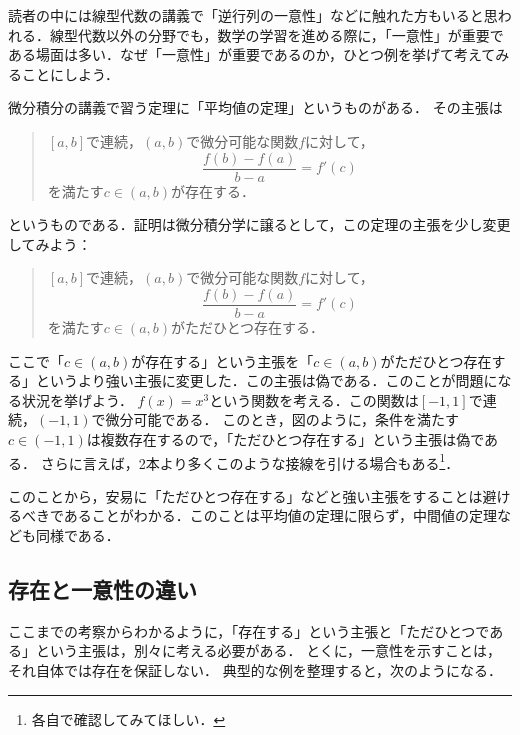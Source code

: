 読者の中には線型代数の講義で「逆行列の一意性」などに触れた方もいると思われる．線型代数以外の分野でも，数学の学習を進める際に，「一意性」が重要である場面は多い．なぜ「一意性」が重要であるのか，ひとつ例を挙げて考えてみることにしよう．

微分積分の講義で習う定理に「平均値の定理」というものがある．
その主張は
\begin{quotation}
  $[a,b]$で連続，$(a,b)$で微分可能な関数$f$に対して，
  \[
    \frac{f(b)-f(a)}{b-a}=f'(c)
  \]
  を満たす$ c \in (a,b)$が存在する．
\end{quotation}

というものである．証明は微分積分学に譲るとして，この定理の主張を少し変更してみよう：

\begin{quotation}
  $[a,b]$で連続，$(a,b)$で微分可能な関数$f$に対して，
  \[
    \frac{f(b)-f(a)}{b-a}=f'(c)
  \]
  を満たす$ c \in (a,b)$がただひとつ存在する．
\end{quotation}


ここで「$c \in (a,b)$が存在する」という主張を「$c \in (a,b)$がただひとつ存在する」というより強い主張に変更した．この主張は偽である．このことが問題になる状況を挙げよう．
$f(x)=x^3$という関数を考える．この関数は$[-1,1]$で連続，$(-1,1)$で微分可能である．
このとき，図のように，条件を満たす$c \in (-1,1)$は複数存在するので，「ただひとつ存在する」という主張は偽である．
さらに言えば，2本より多くこのような接線を引ける場合もある\footnote{各自で確認してみてほしい．}．

このことから，安易に「ただひとつ存在する」などと強い主張をすることは避けるべきであることがわかる．このことは平均値の定理に限らず，中間値の定理なども同様である．

\subsection{存在と一意性の違い}

ここまでの考察からわかるように，「存在する」という主張と「ただひとつである」という主張は，別々に考える必要がある．
とくに，一意性を示すことは，それ自体では存在を保証しない．
典型的な例を整理すると，次のようになる．

